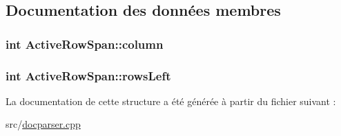 \subsection{Documentation des données membres}
\hypertarget{struct_active_row_span_ab190ef70644400cd0fb5f51ac99800b3}{}
\subsubsection[{column}]{\setlength{\rightskip}{0pt plus 5cm}int Active\+Row\+Span\+::column}\label{struct_active_row_span_ab190ef70644400cd0fb5f51ac99800b3}
\hypertarget{struct_active_row_span_a5500562d0cb80ec523f6a48e8469e251}{}
\subsubsection[{rows\+Left}]{\setlength{\rightskip}{0pt plus 5cm}int Active\+Row\+Span\+::rows\+Left}\label{struct_active_row_span_a5500562d0cb80ec523f6a48e8469e251}


La documentation de cette structure a été générée à partir du fichier suivant \+:\begin{DoxyCompactItemize}
\item 
src/\hyperlink{docparser_8cpp}{docparser.\+cpp}\end{DoxyCompactItemize}
